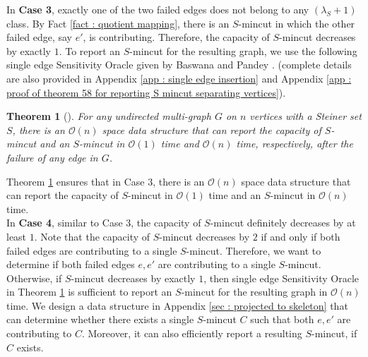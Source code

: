 \documentclass[letterpaper,11pt]{article}
\newtheorem{theorem}{Theorem}[]
\begin{document}
\noindent
In \textbf{Case 3}, exactly one of the two failed edges does not belong to any $(\lambda_S+1)$ class. By Fact \ref{fact : quotient mapping}, there is an $S$-mincut in which the other failed edge, say $e'$, is contributing. Therefore, the capacity of $S$-mincut decreases by exactly $1$. To report an $S$-mincut for the resulting graph, we use the following single edge Sensitivity Oracle given by Baswana and Pandey \cite{DBLP:conf/soda/BaswanaP22}. (complete details are also provided in Appendix \ref{app : single edge insertion} and Appendix \ref{app : proof of theorem 58 for reporting S mincut separating vertices}).
\begin{theorem} [\cite{DBLP:conf/soda/BaswanaP22}] \label{thm : single edge Sensitivity Oracle} 
    For any undirected multi-graph $G$ on $n$ vertices with a Steiner set $S$, there is an ${\mathcal O}(n)$ space data structure that can report the capacity of $S$-mincut and an $S$-mincut in ${\mathcal O}(1)$ time and ${\mathcal O}(n)$ time, respectively, after the failure of any edge in $G$. 
\end{theorem}
Theorem \ref{thm : single edge Sensitivity Oracle} ensures that in Case 3, there is an ${\mathcal O}(n)$ space data structure that can report the capacity of $S$-mincut in ${\mathcal O}(1)$ time and an $S$-mincut in ${\mathcal O}(n)$ time.\\


\noindent
In \textbf{Case 4},
similar to Case $3$, the capacity of $S$-mincut definitely decreases by at least $1$.
Note that the capacity of $S$-mincut decreases by $2$ if and only if both failed edges are contributing to a single $S$-mincut. Therefore, we want to determine if both failed edges $e,e'$ are contributing to a single $S$-mincut. Otherwise, if $S$-mincut decreases by exactly $1$, then single edge Sensitivity Oracle in Theorem \ref{thm : single edge Sensitivity Oracle} is sufficient to report an $S$-mincut for the resulting graph in ${\mathcal O}(n)$ time. We design a data structure in Appendix \ref{sec : projected to skeleton} that can determine whether there exists a single $S$-mincut $C$ such that both $e,e'$ are contributing to $C$. Moreover, it can also efficiently report a resulting $S$-mincut, if $C$ exists. 
\end{document}
